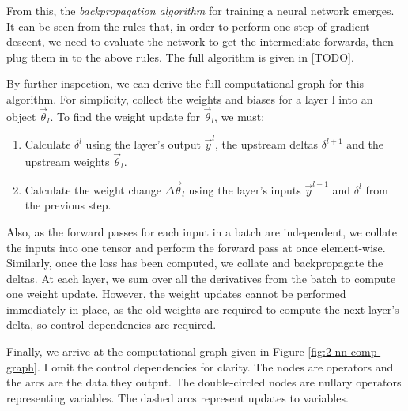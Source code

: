 
From this, the \textit{backpropagation algorithm} for training a neural network emerges.
It can be seen from the rules that, in order to perform one step of gradient descent, we need to evaluate the network to get the intermediate forwards, then plug them in to the above rules.
The full algorithm is given in  [TODO].

By further inspection, we can derive the full computational graph for this algorithm.
For simplicity, collect the weights and biases for a layer l into an object \(\vec{\theta}_l\).
To find the weight update for \(\vec{\theta}_l\), we must:

\begin{enumerate}[topsep=0.2em]
    \item Calculate \(\delta^l\) using the layer's output \(\vec{y}^l\), the upstream deltas \(\delta^{l+1}\) and the upstream weights \(\vec{\theta}_l\).
    \item Calculate the weight change \(\Delta\vec{\theta}_l\) using the layer's inputs \(\vec{y}^{l-1}\) and \(\delta^l\) from the previous step.
\end{enumerate}

Also, as the forward passes for each input in a batch are independent, we collate the inputs into one tensor and perform the forward pass at once element-wise.
Similarly, once the loss has been computed, we collate and backpropagate the deltas.
At each layer, we sum over all the derivatives from the batch to compute one weight update.
However, the weight updates cannot be performed immediately in-place, as the old weights are required to compute the next layer's delta, so control dependencies are required.

Finally, we arrive at the computational graph given in Figure \ref{fig:2-nn-comp-graph}.
I omit the control dependencies for clarity.
The nodes are operators and the arcs are the data they output.
The double-circled nodes are nullary operators representing variables.
The dashed arcs represent updates to variables.

